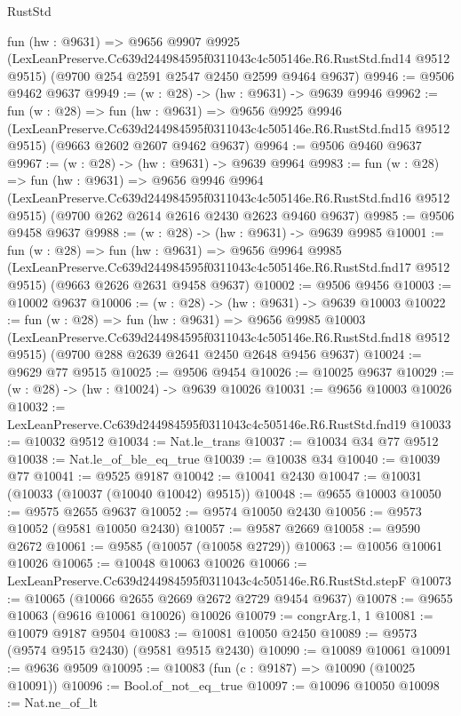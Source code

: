 \begin{lexlean}{RustStd}
\begin{coremodule}
  fun (hw : @9631) =>
  @9656
    @9907
    @9925
    (LexLeanPreserve.Cc639d244984595f0311043c4c505146e.R6.RustStd.fnd14 @9512 @9515)
    (@9700 @254 @2591 @2547 @2450 @2599 @9464 @9637)
@9946 := @9506 @9462 @9637
@9949 := (w : @28) -> (hw : @9631) -> @9639 @9946
@9962 := fun (w : @28) =>
  fun (hw : @9631) =>
  @9656
    @9925
    @9946
    (LexLeanPreserve.Cc639d244984595f0311043c4c505146e.R6.RustStd.fnd15 @9512 @9515)
    (@9663 @2602 @2607 @9462 @9637)
@9964 := @9506 @9460 @9637
@9967 := (w : @28) -> (hw : @9631) -> @9639 @9964
@9983 := fun (w : @28) =>
  fun (hw : @9631) =>
  @9656
    @9946
    @9964
    (LexLeanPreserve.Cc639d244984595f0311043c4c505146e.R6.RustStd.fnd16 @9512 @9515)
    (@9700 @262 @2614 @2616 @2430 @2623 @9460 @9637)
@9985 := @9506 @9458 @9637
@9988 := (w : @28) -> (hw : @9631) -> @9639 @9985
@10001 := fun (w : @28) =>
  fun (hw : @9631) =>
  @9656
    @9964
    @9985
    (LexLeanPreserve.Cc639d244984595f0311043c4c505146e.R6.RustStd.fnd17 @9512 @9515)
    (@9663 @2626 @2631 @9458 @9637)
@10002 := @9506 @9456
@10003 := @10002 @9637
@10006 := (w : @28) -> (hw : @9631) -> @9639 @10003
@10022 := fun (w : @28) =>
  fun (hw : @9631) =>
  @9656
    @9985
    @10003
    (LexLeanPreserve.Cc639d244984595f0311043c4c505146e.R6.RustStd.fnd18 @9512 @9515)
    (@9700 @288 @2639 @2641 @2450 @2648 @9456 @9637)
@10024 := @9629 @77 @9515
@10025 := @9506 @9454
@10026 := @10025 @9637
@10029 := (w : @28) -> (hw : @10024) -> @9639 @10026
@10031 := @9656 @10003 @10026
@10032 := LexLeanPreserve.Cc639d244984595f0311043c4c505146e.R6.RustStd.fnd19
@10033 := @10032 @9512
@10034 := Nat.le_trans
@10037 := @10034 @34 @77 @9512
@10038 := Nat.le_of_ble_eq_true
@10039 := @10038 @34
@10040 := @10039 @77
@10041 := @9525 @9187
@10042 := @10041 @2430
@10047 := @10031 (@10033 (@10037 (@10040 @10042) @9515))
@10048 := @9655 @10003
@10050 := @9575 @2655 @9637
@10052 := @9574 @10050 @2430
@10056 := @9573 @10052 (@9581 @10050 @2430)
@10057 := @9587 @2669
@10058 := @9590 @2672
@10061 := @9585 (@10057 (@10058 @2729))
@10063 := @10056 @10061 @10026
@10065 := @10048 @10063 @10026
@10066 := LexLeanPreserve.Cc639d244984595f0311043c4c505146e.R6.RustStd.stepF
@10073 := @10065 (@10066 @2655 @2669 @2672 @2729 @9454 @9637)
@10078 := @9655 @10063 (@9616 @10061 @10026) @10026
@10079 := congrArg.{1, 1}
@10081 := @10079 @9187 @9504
@10083 := @10081 @10050 @2450
@10089 := @9573 (@9574 @9515 @2430) (@9581 @9515 @2430)
@10090 := @10089 @10061
@10091 := @9636 @9509
@10095 := @10083 (fun (c : @9187) => @10090 (@10025 @10091))
@10096 := Bool.of_not_eq_true
@10097 := @10096 @10050
@10098 := Nat.ne_of_lt

\end{coremodule}
\end{lexlean}
